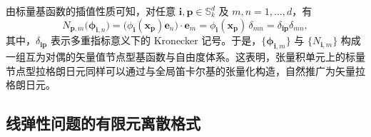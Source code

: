 由标量基函数的插值性质可知，对任意 $\boldsymbol{i},\boldsymbol{p}\in\mathbb{S}_k^d$ 及 $m,n=1,\dots,d$，有
\[
N_{\boldsymbol{p},m}\big(\boldsymbol{\phi}_{\boldsymbol{i},n}\big) = \big(\phi_{\boldsymbol{i}}(\boldsymbol{x}_{\boldsymbol{p}})\boldsymbol{e}_n\big)\cdot\boldsymbol{e}_m = \phi_{\boldsymbol{i}}(\boldsymbol{x}_{\boldsymbol{p}})\,\delta_{mn} = \delta_{\boldsymbol{i}\boldsymbol{p}}\delta_{mn},
\]
其中，$\delta_{\boldsymbol{i}\boldsymbol{p}}$ 表示多重指标意义下的 Kronecker 记号。于是，$\{\boldsymbol{\phi}_{\boldsymbol{i},m}\}$ 与 $\{N_{\boldsymbol{i},m}\}$ 构成一组互为对偶的矢量值节点型基函数与自由度体系。这表明，张量积单元上的标量节点型拉格朗日元同样可以通过与全局笛卡尔基的张量化构造，自然推广为矢量拉格朗日元。


%


\subsection{线弹性问题的有限元离散格式}
\label{subsec:elastic_discrete}

